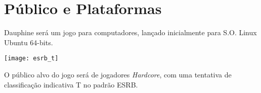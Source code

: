 \AddToShipoutPicture{\BackgroundPic}

\section*{Público e Plataformas}

Dauphine será um jogo para computadores, lançado inicialmente para S.O. Linux Ubuntu 64-bits.\newline

\begin{minipage}[h]{\textwidth}
	\begin{minipage}[h]{0.25\textwidth}
		\begin{center}
			\texttt{[image: esrb\_t]}
		\end{center}
	\end{minipage}
	\begin{minipage}[h]{0.75\textwidth}
		O público alvo do jogo será de jogadores \emph{Hardcore}, com uma tentativa de classificação indicativa T no padrão ESRB.	
	\end{minipage}
\end{minipage}



